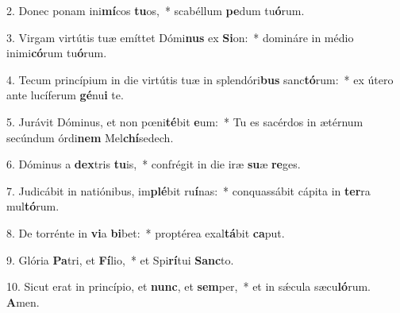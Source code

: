 2. Donec ponam ini\textbf{mí}cos \textbf{tu}os,~*  scabéllum \textbf{pe}dum tu\textbf{ó}rum.\

3. Virgam virtútis tuæ emíttet Dómi\textbf{nus} ex \textbf{Si}on:~*  domináre in médio inimi\textbf{có}rum tu\textbf{ó}rum.\

4. Tecum princípium in die virtútis tuæ in splendóri\textbf{bus} sanc\textbf{tó}rum:~*  ex útero ante lucíferum \textbf{gé}nu\textbf{i} te.\

5. Jurávit Dóminus, et non pœni\textbf{té}bit \textbf{e}um:~*  Tu es sacérdos in ætérnum secúndum órdi\textbf{nem} Mel\textbf{chí}sedech.\

6. Dóminus a \textbf{dex}tris \textbf{tu}is,~*  confrégit in die iræ \textbf{su}æ \textbf{re}ges.\

7. Judicábit in natiónibus, im\textbf{plé}bit ru\textbf{í}nas:~*  conquassábit cápita in \textbf{ter}ra mul\textbf{tó}rum.\

8. De torrénte in \textbf{vi}a \textbf{bi}bet:~*  proptérea exal\textbf{tá}bit \textbf{ca}put.\

9. Glória \textbf{Pa}tri, et \textbf{Fí}lio,~*  et Spi\textbf{rí}tui \textbf{Sanc}to.\

10. Sicut erat in princípio, et \textbf{nunc}, et \textbf{sem}per,~*  et in sǽcula sæcu\textbf{ló}rum. \textbf{A}men.\

